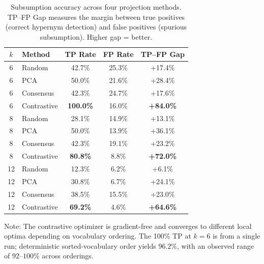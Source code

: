 \documentclass[10pt]{article}
\begin{document}
\begin{table}[ht]
\centering
\caption{Subsumption accuracy across four projection methods. TP--FP Gap measures the margin between true positives (correct hypernym detection) and false positives (spurious subsumption). Higher gap = better.}
\label{tab:pca}
\begin{tabular}{clccc}
\toprule
$k$ & Method & TP Rate & FP Rate & TP--FP Gap \\
\midrule
6  & Random      & 42.7\% & 25.3\% & +17.4\% \\
6  & PCA         & 50.0\% & 21.6\% & +28.4\% \\
6  & Consensus   & 42.3\% & 24.7\% & +17.6\% \\
6  & Contrastive & \textbf{100.0\%} & 16.0\% & \textbf{+84.0\%} \\
\midrule
8  & Random      & 28.1\% & 14.9\% & +13.1\% \\
8  & PCA         & 50.0\% & 13.9\% & +36.1\% \\
8  & Consensus   & 42.3\% & 19.1\% & +23.2\% \\
8  & Contrastive & \textbf{80.8\%} & 8.8\%  & \textbf{+72.0\%} \\
\midrule
12 & Random      & 12.3\% & 6.2\%  & +6.1\% \\
12 & PCA         & 30.8\% & 6.7\%  & +24.1\% \\
12 & Consensus   & 38.5\% & 15.5\% & +23.0\% \\
12 & Contrastive & \textbf{69.2\%} & 4.6\%  & \textbf{+64.6\%} \\
\bottomrule
\end{tabular}
\vspace{2pt}
\small{Note: The contrastive optimizer is gradient-free and converges to different local optima depending on vocabulary ordering. The 100\% TP at $k\!=\!6$ is from a single run; deterministic sorted-vocabulary order yields $96.2\%$, with an observed range of $92$--$100\%$ across orderings.}
\end{table}
\end{document}
